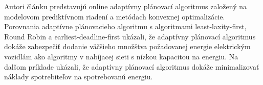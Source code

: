 






Autori článku \cite{lee2020adaptive} predstavujú online adaptívny plánovací algoritmus založený na modelovom prediktívnom riadení a metódach konvexnej optimalizácie.  Porovnania adaptívne plánovacieho algoritmu s algoritmami least-laxity-first, Round Robin a earliest-deadline-first ukázali, že adaptívny plánovací algoritmus dokáže zabezpečiť dodanie väčšieho množštva požadovanej energie elektrickým vozidlám  ako algoritmy v nabíjacej sieti s nízkou kapacitou na energiu. Na ďalšom príklade ukázali, že adaptívny plánovací algoritmus dokáže minimalizovať náklady spotrebiteľov na spotrebovanú energiu.


